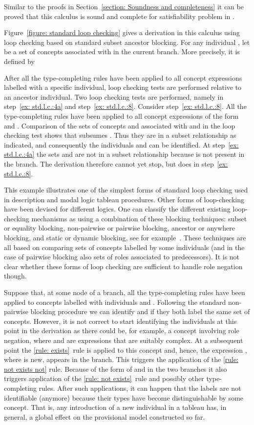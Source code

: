 \documentclass[leqno
,pdflatex
,prodmode
,acmtocl
]{acmsmall}
\begin{document}
Similar to the proofs in Section~\ref{section: Soundness and completeness}
it can be proved that
this calculus is sound and complete for satisfiability problem in .

Figure~\ref{figure: standard loop checking} gives a derivation in this
calculus using loop checking based on standard subset ancestor blocking.
For any individual ,
let  be a set of concepts associated with 
in the current branch. More precisely,
it is defined by

After all the type-completing rules have been applied to all concept
expressions labelled with a specific individual, loop checking tests
are performed relative to an ancestor individual.
Two loop checking tests are performed, namely in step~\ref{ex: std.l.c.:4a}
and step~\ref{ex: std.l.c.:8}.
Consider step~\ref{ex: std.l.c.:8}.
All the type-completing rules have been applied to all concept expressions of the
form  and .
Comparison of the sets of concepts  and   
associated with  and  in the loop checking test shows that 
 subsumes .
Thus they are in a subset relationship as indicated, and
consequently the individuals  and 
can be identified.
At step~\ref{ex: std.l.c.:4a} the sets 
 and 
are not in a subset
relationship
because  is not present in the branch.
The derivation therefore cannot yet stop, but does in step~\ref{ex: std.l.c.:8}.

This example illustrates one of the simplest forms of standard loop checking
used in description and modal logic tableau procedures.
Other forms of loop-checking have been devised for different logics.
One can classify the different existing loop-checking mechanisms as using a
combination of these blocking techniques:
subset or equality blocking, non-pairwise or pairwise blocking,
ancestor or anywhere blocking, and static or dynamic blocking, see for example~\cite{BaaderSattler-OTADL-2001}.
These techniques are all based on comparing sets of concepts labelled by some
individuals (and in the case of pairwise blocking also sets of roles
associated to predecessors).
It is not clear whether these forms of loop checking are sufficient to handle role
negation though.

Suppose that, at some node of a branch, all the type-completing
rules have been applied to concepts labelled with individuals 
and .
Following the standard non-pairwise blocking procedure
we can identify  and 
if they both label the same set of concepts.
However, it is not correct to start identifying the individuals
at this point in the derivation as there could be, for example, a concept  involving role negation, where  and  are expressions that are suitably complex.
At a subsequent point the 
\eqref{rule: exists}~rule is applied to this concept and, hence,
the expression ,
where  is new,
appears in the branch. This triggers the application of
the \eqref{rule: not exists not} rule. Because of the form of 
and  in the two branches it also triggers application of the
\eqref{rule: not exists}~rule and
possibly other type-completing rules.
After such applications, it can happen that the labels are not
identifiable (anymore)
because their types have become distinguishable by some concept. 
That is, any introduction of a new individual in a tableau 
has, in general, a global effect on the provisional model
constructed so far.
\end{document}
